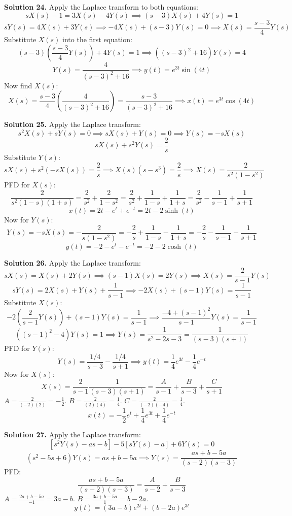 \documentclass[11pt, letterpaper]{article}
\theoremstyle{definition}
\theoremstyle{remark}
\begin{document}
\vspace{1em}
\textbf{Solution 24.}
Apply the Laplace transform to both equations:
\[ sX(s) - 1 = 3X(s) - 4Y(s) \implies (s - 3)X(s) + 4Y(s) = 1 \]
\[ sY(s) = 4X(s) + 3Y(s) \implies -4X(s) + (s - 3)Y(s) = 0 \implies X(s) = \frac{s - 3}{4}Y(s) \]
Substitute $X(s)$ into the first equation:
\[ (s - 3)\left(\frac{s - 3}{4}Y(s)\right) + 4Y(s) = 1 \implies \left((s - 3)^2 + 16\right)Y(s) = 4 \]
\[ Y(s) = \frac{4}{(s - 3)^2 + 16} \implies y(t) = e^{3t}\sin(4t) \]
Now find $X(s)$:
\[ X(s) = \frac{s - 3}{4} \left( \frac{4}{(s - 3)^2 + 16} \right) = \frac{s - 3}{(s - 3)^2 + 16} \implies x(t) = e^{3t}\cos(4t) \]

\vspace{1em}
\textbf{Solution 25.}
Apply the Laplace transform:
\[ s^2 X(s) + sY(s) = 0 \implies sX(s) + Y(s) = 0 \implies Y(s) = -sX(s) \]
\[ sX(s) + s^2 Y(s) = \frac{2}{s} \]
Substitute $Y(s)$:
\[ sX(s) + s^2(-sX(s)) = \frac{2}{s} \implies X(s)(s - s^3) = \frac{2}{s} \implies X(s) = \frac{2}{s^2(1 - s^2)} \]
PFD for $X(s)$:
\[ \frac{2}{s^2(1 - s)(1 + s)} = \frac{2}{s^2} + \frac{2}{1 - s^2} = \frac{2}{s^2} + \frac{1}{1 - s} + \frac{1}{1 + s} = \frac{2}{s^2} - \frac{1}{s - 1} + \frac{1}{s + 1} \]
\[ x(t) = 2t - e^t + e^{-t} = 2t - 2\sinh(t) \]
Now for $Y(s)$:
\[ Y(s) = -sX(s) = -\frac{2}{s(1 - s^2)} = -\frac{2}{s} + \frac{1}{1 - s} - \frac{1}{1 + s} = -\frac{2}{s} - \frac{1}{s - 1} - \frac{1}{s + 1} \]
\[ y(t) = -2 - e^t - e^{-t} = -2 - 2\cosh(t) \]

\vspace{1em}
\textbf{Solution 26.}
Apply the Laplace transform:
\[ sX(s) = X(s) + 2Y(s) \implies (s - 1)X(s) = 2Y(s) \implies X(s) = \frac{2}{s - 1}Y(s) \]
\[ sY(s) = 2X(s) + Y(s) + \frac{1}{s - 1} \implies -2X(s) + (s - 1)Y(s) = \frac{1}{s - 1} \]
Substitute $X(s)$:
\[ -2\left(\frac{2}{s - 1}Y(s)\right) + (s - 1)Y(s) = \frac{1}{s - 1} \implies \frac{-4 + (s - 1)^2}{s - 1}Y(s) = \frac{1}{s - 1} \]
\[ ((s - 1)^2 - 4)Y(s) = 1 \implies Y(s) = \frac{1}{s^2 - 2s - 3} = \frac{1}{(s - 3)(s + 1)} \]
PFD for $Y(s)$:
\[ Y(s) = \frac{1/4}{s - 3} - \frac{1/4}{s + 1} \implies y(t) = \frac{1}{4}e^{3t} - \frac{1}{4}e^{-t} \]
Now for $X(s)$:
\[ X(s) = \frac{2}{s - 1} \frac{1}{(s - 3)(s + 1)} = \frac{A}{s - 1} + \frac{B}{s - 3} + \frac{C}{s + 1} \]
$A = \frac{2}{(-2)(2)} = -\frac{1}{2}$. $B = \frac{2}{(2)(4)} = \frac{1}{4}$. $C = \frac{2}{(-2)(-4)} = \frac{1}{4}$.
\[ x(t) = -\frac{1}{2}e^t + \frac{1}{4}e^{3t} + \frac{1}{4}e^{-t} \]

\vspace{1em}
\textbf{Solution 27.}
Apply the Laplace transform:
\[ [s^2 Y(s) - as - b] - 5[sY(s) - a] + 6Y(s) = 0 \]
\[ (s^2 - 5s + 6)Y(s) = as + b - 5a \implies Y(s) = \frac{as + b - 5a}{(s - 2)(s - 3)} \]
PFD:
\[ \frac{as + b - 5a}{(s - 2)(s - 3)} = \frac{A}{s - 2} + \frac{B}{s - 3} \]
$A = \frac{2a + b - 5a}{-1} = 3a - b$.
$B = \frac{3a + b - 5a}{1} = b - 2a$.
\[ y(t) = (3a - b)e^{2t} + (b - 2a)e^{3t} \]
\end{document}
